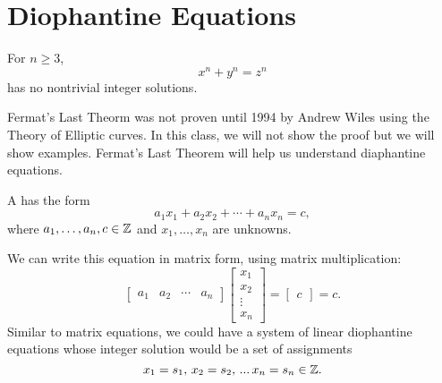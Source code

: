 \section{Diophantine Equations} %

\begin{theorem} For $n \geq 3$, $$x^n + y^n = z^n$$ has no nontrivial integer solutions.
\end{theorem}

Fermat's Last Theorm was not proven until 1994 by Andrew Wiles using the Theory of Elliptic curves. In this class, we will not show the proof but we will show examples. Fermat's Last Theorem will help us understand diaphantine equations.
\\
\begin{definition}
A  has the form 
\[
a_1 x_1 + a_2 x_2 + \cdots + a_n x_n = c,
\]
where $a_1,\ldots,a_n, c \in \mathbb{Z}$ and $x_1,\ldots,x_n$ are unknowns.
\end{definition}

We can write this equation in  matrix form, using matrix multiplication:
$$\begin{bmatrix}
a_1 & a_2 & \cdots & a_n
\end{bmatrix}
\begin{bmatrix}
x_1 \\
x_2 \\
\vdots\\
x_n
\end{bmatrix}
=
\begin{bmatrix}
c
\end{bmatrix}
= c.$$
Similar to matrix equations, we could have a system of linear diophantine equations whose integer solution would be a set of assignments $$x_1 = s_1, \, x_2 = s_2, \, ... \, x_n = s_n \in \mathbb{Z}.$$

